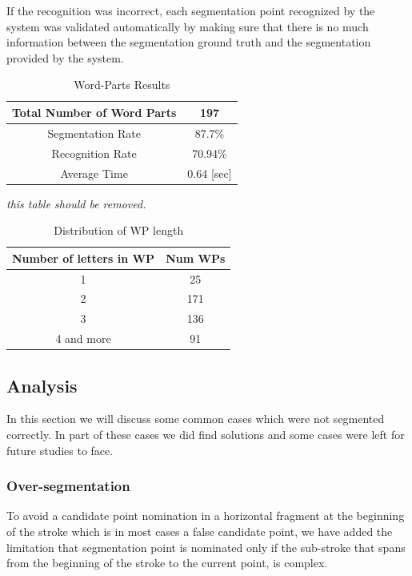 \documentclass[journal,compsoc]{IEEEtran}
\begin{document}
If the recognition was incorrect, each segmentation point recognized by the system was validated automatically by making sure that there is no much information between the segmentation ground truth and the segmentation provided by the system.

\begin{table}[h]
\caption{Word-Parts Results}
\begin{tabular}{ | c | c | }
  \hline                     
    Total Number of Word Parts & 197 \\ 
  \hline
  Segmentation Rate &  87.7\% \\ 
 \hline
  Recognition Rate &  70.94\% \\ 
 \hline
  Average Time & 0.64 [sec] \\
\hline
\end{tabular}
\centering
\label{table:wp_results} 
\end{table}

\emph{this table should be removed.}
\begin{table}[h]
\caption{Distribution of WP length}
\begin{tabular}{ | c | c | }
\hline
Number of letters in WP & Num WPs\\
  \hline                     
    1 & 25 \\ 
  \hline
  2 &  171 \\ 
 \hline
  3 & 136 \\ 
 \hline
  4 and more & 91 \\
\hline
\end{tabular}
\centering
\label{table:wp_length_dist} 
\end{table}


\subsection{Analysis}
In this section we will discuss some common cases which were not segmented correctly. In part of these cases we did find solutions and some cases were left for future studies to face. 
\subsubsection{Over-segmentation}
To avoid a candidate point nomination in a horizontal fragment at the beginning of the stroke which is in most cases a false candidate point, we have added the limitation that segmentation point is nominated only if the sub-stroke that spans from the beginning of the stroke to the current point, is complex.
\end{document}
